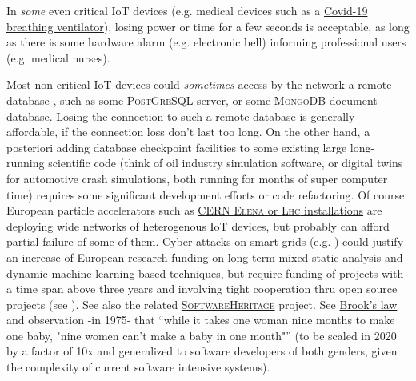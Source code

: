 {{ In \emph{some} even critical IoT devices (e.g. medical devices
  such  as a \href{https://github.com/Recovid/}{Covid-19 breathing
   ventilator}), losing power or time for a few seconds is acceptable,
 as long as there is some hardware alarm (e.g. electronic bell)
 informing professional users (e.g. medical nurses).

 Most non-critical IoT devices could \emph{sometimes} access by the
 network a remote database  ,
 such as some \href{https://www.postgresql.org/}{\textsc{PostGreSQL}
   server}, or some \href{https://www.mongodb.com/}{\textsc{MongoDB}
   document database}. Losing the connection to such a remote database
 is generally affordable, if the connection loss don't last too
 long. On the other hand, a posteriori adding database checkpoint
     
  
   facilities to some
 existing large long-running scientific code (think of oil industry
 simulation software, or digital twins for automotive crash
   simulations, both
 running for months of super computer time) requires some significant
 development efforts or code refactoring. Of course European particle
 accelerators such as
 \href{https://home.cern/science/accelerators/}{CERN \textsc{Elena} or
   \textsc{Lhc} installations} are deploying wide networks of
 heterogenous IoT devices, but probably can afford partial failure of
 some of them. Cyber-attacks on smart grids
 (e.g. \cite{lee:2016:analysis-cyberattack}) could justify an increase
 of European research funding on long-term mixed static analysis and
 dynamic machine learning based techniques, but require funding of
 projects with a time span above three years and involving tight
 cooperation thru open source projects (see \cite{Brooks:1995:MM,
   Lerner-Tirole:2000:economics-open-source,
   Tirole:2018:eco-bien-commun, hashem:2015:rise}). See also the related
 \href{https://www.softwareheritage.org/}{\textsc{SoftwareHeritage}}
 project. See
 \href{https://en.wikipedia.org/wiki/Brooks's_law}{Brook's law} and
 observation -in 1975- that ``while it takes one woman nine months to
 make one baby, "nine women can't make a baby in one month"'' (to be
 scaled in 2020 by a factor of 10x and generalized to software
 developers of both genders, given the complexity of current software
 intensive systems).

}}
